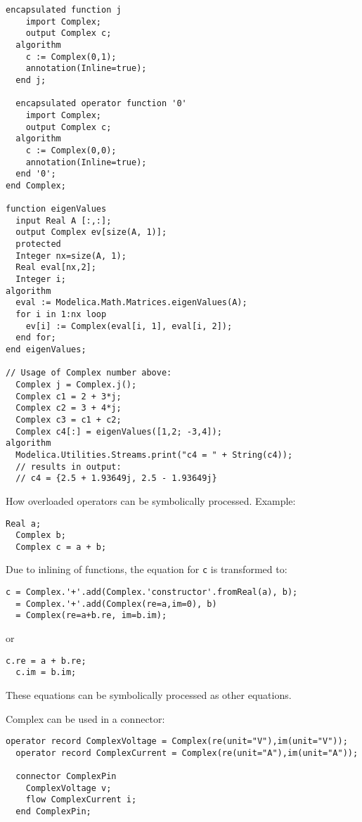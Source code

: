 \begin{example}
\begin{lstlisting}[language=modelica,escapechar=!]
  encapsulated function j
    import Complex;
    output Complex c;
  algorithm
    c := Complex(0,1);
    annotation(Inline=true);
  end j;

  encapsulated operator function '0'
    import Complex;
    output Complex c;
  algorithm
    c := Complex(0,0);
    annotation(Inline=true);
  end '0';
end Complex;

function eigenValues
  input Real A [:,:];
  output Complex ev[size(A, 1)];
  protected
  Integer nx=size(A, 1);
  Real eval[nx,2];
  Integer i;
algorithm
  eval := Modelica.Math.Matrices.eigenValues(A);
  for i in 1:nx loop
    ev[i] := Complex(eval[i, 1], eval[i, 2]);
  end for;
end eigenValues;

// Usage of Complex number above:
  Complex j = Complex.j();
  Complex c1 = 2 + 3*j;
  Complex c2 = 3 + 4*j;
  Complex c3 = c1 + c2;
  Complex c4[:] = eigenValues([1,2; -3,4]);
algorithm
  Modelica.Utilities.Streams.print("c4 = " + String(c4));
  // results in output:
  // c4 = {2.5 + 1.93649j, 2.5 - 1.93649j}
\end{lstlisting}

How overloaded operators can be symbolically processed. Example:
\begin{lstlisting}[language=modelica]
  Real a;
  Complex b;
  Complex c = a + b;
\end{lstlisting}
Due to inlining of functions, the equation for \lstinline!c! is
transformed to:
\begin{lstlisting}[language=modelica]
c = Complex.'+'.add(Complex.'constructor'.fromReal(a), b);
  = Complex.'+'.add(Complex(re=a,im=0), b)
  = Complex(re=a+b.re, im=b.im);
\end{lstlisting}
or
\begin{lstlisting}[language=modelica]
  c.re = a + b.re;
  c.im = b.im;
\end{lstlisting}
These equations can be symbolically processed as other equations.

Complex can be used in a connector:
\begin{lstlisting}[language=modelica]
  operator record ComplexVoltage = Complex(re(unit="V"),im(unit="V"));
  operator record ComplexCurrent = Complex(re(unit="A"),im(unit="A"));

  connector ComplexPin
    ComplexVoltage v;
    flow ComplexCurrent i;
  end ComplexPin;


\end{lstlisting}
\end{example}
